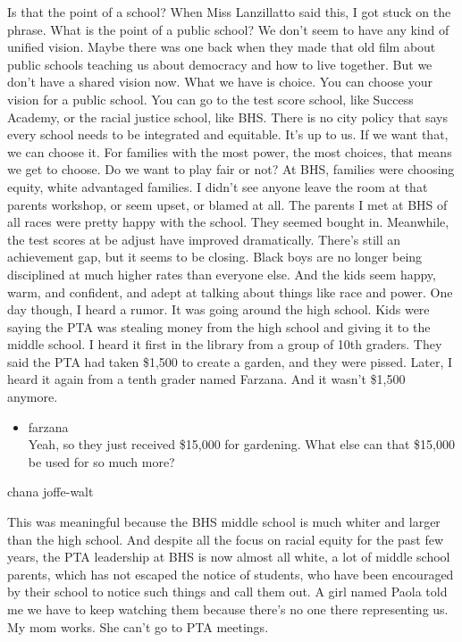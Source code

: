 Is that the point of a school? When Miss Lanzillatto said this, I got
stuck on the phrase. What is the point of a public school? We don't seem
to have any kind of unified vision. Maybe there was one back when they
made that old film about public schools teaching us about democracy and
how to live together. But we don't have a shared vision now. What we
have is choice. You can choose your vision for a public school. You can
go to the test score school, like Success Academy, or the racial justice
school, like BHS. There is no city policy that says every school needs
to be integrated and equitable. It's up to us. If we want that, we can
choose it. For families with the most power, the most choices, that
means we get to choose. Do we want to play fair or not? At BHS, families
were choosing equity, white advantaged families. I didn't see anyone
leave the room at that parents workshop, or seem upset, or blamed at
all. The parents I met at BHS of all races were pretty happy with the
school. They seemed bought in. Meanwhile, the test scores at be adjust
have improved dramatically. There's still an achievement gap, but it
seems to be closing. Black boys are no longer being disciplined at much
higher rates than everyone else. And the kids seem happy, warm, and
confident, and adept at talking about things like race and power. One
day though, I heard a rumor. It was going around the high school. Kids
were saying the PTA was stealing money from the high school and giving
it to the middle school. I heard it first in the library from a group of
10th graders. They said the PTA had taken \$1,500 to create a garden,
and they were pissed. Later, I heard it again from a tenth grader named
Farzana. And it wasn't \$1,500 anymore.

\begin{itemize}
\tightlist
\item
  farzana\\
  Yeah, so they just received \$15,000 for gardening. What else can that
  \$15,000 be used for so much more?
\end{itemize}

chana joffe-walt

This was meaningful because the BHS middle school is much whiter and
larger than the high school. And despite all the focus on racial equity
for the past few years, the PTA leadership at BHS is now almost all
white, a lot of middle school parents, which has not escaped the notice
of students, who have been encouraged by their school to notice such
things and call them out. A girl named Paola told me we have to keep
watching them because there's no one there representing us. My mom
works. She can't go to PTA meetings.

